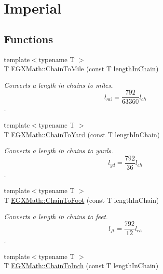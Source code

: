 \hypertarget{group___e_g_x_math-_conversions-_length_conversions-_surveyors-_chain-_imperial}{}\section{Imperial}
\label{group___e_g_x_math-_conversions-_length_conversions-_surveyors-_chain-_imperial}
\subsection*{Functions}
\begin{DoxyCompactItemize}
\item 
{\footnotesize template$<$typename T $>$ }\\T \mbox{\hyperlink{group___e_g_x_math-_conversions-_length_conversions-_surveyors-_chain-_imperial_ga260b1e534400c8ee9ec5001641b2a451}{E\+G\+X\+Math\+::\+Chain\+To\+Mile}} (const T length\+In\+Chain)
\begin{DoxyCompactList}\small\item\em Converts a length in chains to miles. \[ l_{mi}=\frac{792}{63360} l_{ch} \]. \end{DoxyCompactList}\item 
{\footnotesize template$<$typename T $>$ }\\T \mbox{\hyperlink{group___e_g_x_math-_conversions-_length_conversions-_surveyors-_chain-_imperial_ga9d6b8e5d2dfaf555b923e8ba2d324ae4}{E\+G\+X\+Math\+::\+Chain\+To\+Yard}} (const T length\+In\+Chain)
\begin{DoxyCompactList}\small\item\em Converts a length in chains to yards. \[ l_{yd}= \frac{792}{36} l_{ch} \]. \end{DoxyCompactList}\item 
{\footnotesize template$<$typename T $>$ }\\T \mbox{\hyperlink{group___e_g_x_math-_conversions-_length_conversions-_surveyors-_chain-_imperial_gab1249a8d1535d07fcb4844d687133a49}{E\+G\+X\+Math\+::\+Chain\+To\+Foot}} (const T length\+In\+Chain)
\begin{DoxyCompactList}\small\item\em Converts a length in chains to feet. \[ l_{ft}= \frac{792}{12} l_{ch} \]. \end{DoxyCompactList}\item 
{\footnotesize template$<$typename T $>$ }\\T \mbox{\hyperlink{group___e_g_x_math-_conversions-_length_conversions-_surveyors-_chain-_imperial_gabbb970d9c4833232722a01a846c30bc8}{E\+G\+X\+Math\+::\+Chain\+To\+Inch}} (const T length\+In\+Chain)

\end{DoxyCompactItemize}
